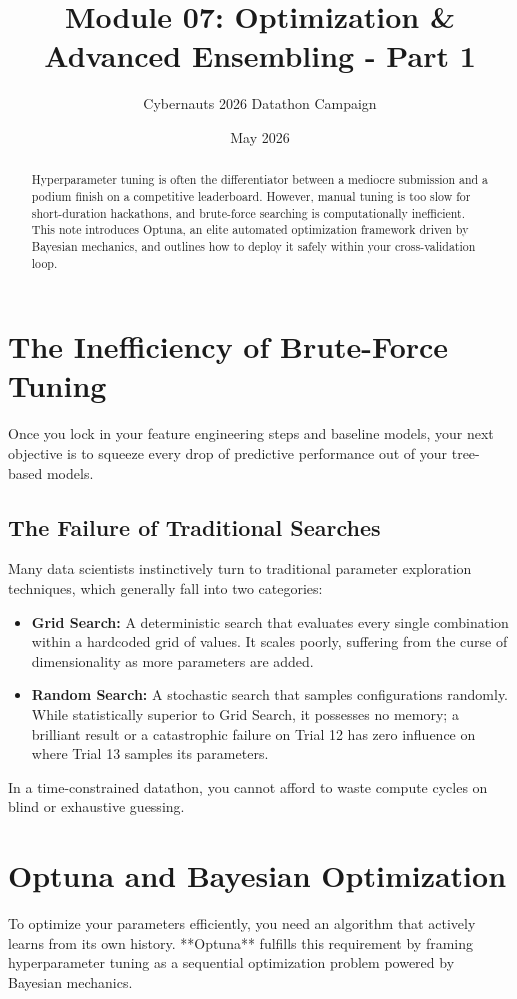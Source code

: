 \documentclass{article}
\title{Module 07: Optimization \& Advanced Ensembling - Part 1}
\author{Cybernauts 2026 Datathon Campaign}
\date{May 2026}
\begin{document}
\maketitle

\begin{abstract}
Hyperparameter tuning is often the differentiator between a mediocre submission and a podium finish on a competitive leaderboard. However, manual tuning is too slow for short-duration hackathons, and brute-force searching is computationally inefficient. This note introduces Optuna, an elite automated optimization framework driven by Bayesian mechanics, and outlines how to deploy it safely within your cross-validation loop.
\end{abstract}

\tableofcontents
\newpage

\section{The Inefficiency of Brute-Force Tuning}
Once you lock in your feature engineering steps and baseline models, your next objective is to squeeze every drop of predictive performance out of your tree-based models.

\subsection{The Failure of Traditional Searches}
Many data scientists instinctively turn to traditional parameter exploration techniques, which generally fall into two categories:
\begin{itemize}
    \item \textbf{Grid Search:} A deterministic search that evaluates every single combination within a hardcoded grid of values. It scales poorly, suffering from the curse of dimensionality as more parameters are added.
    \item \textbf{Random Search:} A stochastic search that samples configurations randomly. While statistically superior to Grid Search, it possesses no memory; a brilliant result or a catastrophic failure on Trial 12 has zero influence on where Trial 13 samples its parameters.
\end{itemize}

In a time-constrained datathon, you cannot afford to waste compute cycles on blind or exhaustive guessing.

\section{Optuna and Bayesian Optimization}
To optimize your parameters efficiently, you need an algorithm that actively learns from its own history. **Optuna** fulfills this requirement by framing hyperparameter tuning as a sequential optimization problem powered by Bayesian mechanics.
\end{document}
